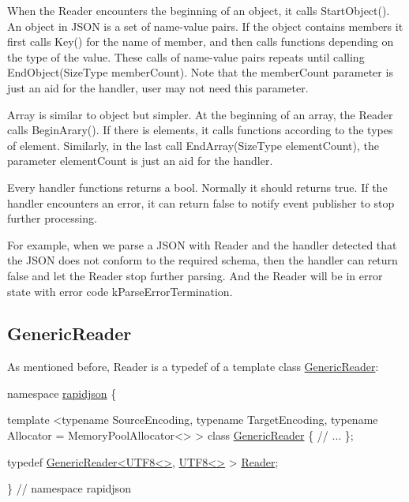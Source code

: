 When the {\ttfamily Reader} encounters the beginning of an object, it calls {\ttfamily Start\+Object()}. An object in J\+S\+ON is a set of name-\/value pairs. If the object contains members it first calls {\ttfamily Key()} for the name of member, and then calls functions depending on the type of the value. These calls of name-\/value pairs repeats until calling {\ttfamily End\+Object(\+Size\+Type member\+Count)}. Note that the {\ttfamily member\+Count} parameter is just an aid for the handler, user may not need this parameter.

Array is similar to object but simpler. At the beginning of an array, the {\ttfamily Reader} calls {\ttfamily Begin\+Arary()}. If there is elements, it calls functions according to the types of element. Similarly, in the last call {\ttfamily End\+Array(\+Size\+Type element\+Count)}, the parameter {\ttfamily element\+Count} is just an aid for the handler.

Every handler functions returns a {\ttfamily bool}. Normally it should returns {\ttfamily true}. If the handler encounters an error, it can return {\ttfamily false} to notify event publisher to stop further processing.

For example, when we parse a J\+S\+ON with {\ttfamily Reader} and the handler detected that the J\+S\+ON does not conform to the required schema, then the handler can return {\ttfamily false} and let the {\ttfamily Reader} stop further parsing. And the {\ttfamily Reader} will be in error state with error code {\ttfamily k\+Parse\+Error\+Termination}.\hypertarget{md_Commun_Externe_RapidJSON_doc_sax.zh-cn_GenericReader}{}\subsection{Generic\+Reader}\label{md_Commun_Externe_RapidJSON_doc_sax.zh-cn_GenericReader}
As mentioned before, {\ttfamily Reader} is a typedef of a template class {\ttfamily \hyperlink{class_generic_reader}{Generic\+Reader}}\+:


\begin{DoxyCode}
\textcolor{keyword}{namespace }\hyperlink{namespacerapidjson}{rapidjson} \{

\textcolor{keyword}{template} <\textcolor{keyword}{typename} SourceEncoding, \textcolor{keyword}{typename} TargetEncoding, \textcolor{keyword}{typename} Allocator = MemoryPoolAllocator<> >
\textcolor{keyword}{class }\hyperlink{class_generic_reader}{GenericReader} \{
    \textcolor{comment}{// ...}
\};

\textcolor{keyword}{typedef} \hyperlink{class_generic_reader}{GenericReader<UTF8<>}, \hyperlink{struct_u_t_f8}{UTF8<>} > \hyperlink{reader_8h_a84f3b66a66647f4ac4267078359188ba}{Reader};

\} \textcolor{comment}{// namespace rapidjson}
\end{DoxyCode}


